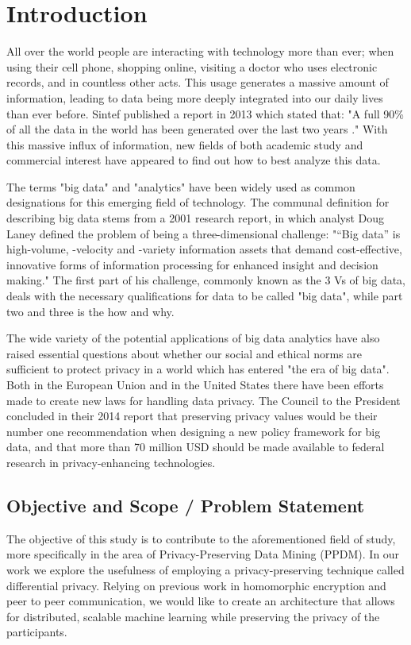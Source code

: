 
\chapter{Introduction}
All over the world people are interacting with technology more than ever; when using their cell phone, shopping online, visiting a doctor who uses electronic records, and in countless other acts. This usage generates a massive amount of information, leading to data being more deeply integrated into our daily lives than ever before. Sintef published a report in 2013 which stated that: "A full 90\% of all the data in the world has been generated over the last two years \cite{dragland2013big}." With this massive influx of information, new fields of both academic study and commercial interest have appeared to find out how to best analyze this data. 

The terms "big data" and "analytics" have been widely used as common designations for this emerging field of technology. The communal definition for describing big data stems from a 2001 research report, in which analyst Doug Laney defined the problem of being a three-dimensional challenge: "“Big data” is high-volume, -velocity and -variety information assets that demand cost-effective, innovative forms of information processing for enhanced insight and decision making." The first part of his challenge, commonly known as the 3 Vs of big data, deals with the necessary qualifications for data to be called "big data", while part two and three is the how and why.  
   
The wide variety of the potential applications of big data analytics have also raised essential questions about whether our social and ethical norms are sufficient to protect privacy in a world which has entered "the era of big data". Both in the European Union and in the United States there have been efforts made to create new laws for handling data privacy. The Council to the President concluded in their 2014 report \cite{house2014bigdata} that preserving privacy values would be their number one recommendation when designing a new policy framework for big data, and that more than 70 million USD should be made available to federal research in privacy-enhancing technologies. 

\section{Objective and Scope / Problem Statement}
The objective of this study is to contribute to the aforementioned field of study, more specifically in the area of Privacy-Preserving Data Mining (PPDM). In our work we explore the usefulness  of employing a privacy-preserving technique called differential privacy. Relying on previous work in homomorphic encryption and peer to peer communication, we would like to create an architecture that allows for distributed, scalable machine learning while preserving the privacy of the participants.

